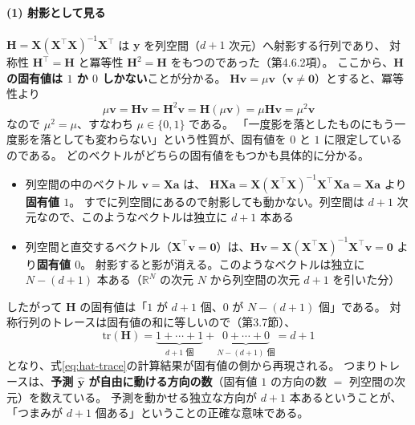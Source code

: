 \paragraph{(1) 射影として見る}
$\bm{H} = \bm{X}(\bm{X}^\top\bm{X})^{-1}\bm{X}^\top$ は $\bm{y}$ を列空間（$d+1$ 次元）へ射影する行列であり、
対称性 $\bm{H}^\top = \bm{H}$ と冪等性 $\bm{H}^2 = \bm{H}$ をもつのであった（第4.6.2項）。
ここから、\textbf{$\bm{H}$ の固有値は $1$ か $0$ しかない}ことが分かる。
$\bm{H}\bm{v} = \mu\bm{v}$（$\bm{v} \neq \bm{0}$）とすると、冪等性より
\begin{equation*}
  \mu\bm{v} = \bm{H}\bm{v} = \bm{H}^2\bm{v} = \bm{H}(\mu\bm{v}) = \mu\bm{H}\bm{v} = \mu^2\bm{v}
\end{equation*}
なので $\mu^2 = \mu$、すなわち $\mu \in \{0, 1\}$ である。
「一度影を落としたものにもう一度影を落としても変わらない」という性質が、固有値を $0$ と $1$ に限定しているのである。
どのベクトルがどちらの固有値をもつかも具体的に分かる。
\begin{itemize}
  \item 列空間の中のベクトル $\bm{v} = \bm{X}\bm{a}$ は、
    $\bm{H}\bm{X}\bm{a} = \bm{X}(\bm{X}^\top\bm{X})^{-1}\bm{X}^\top\bm{X}\bm{a} = \bm{X}\bm{a}$ より\textbf{固有値 $1$}。
    すでに列空間にあるので射影しても動かない。列空間は $d+1$ 次元なので、このようなベクトルは独立に $d+1$ 本ある
  \item 列空間と直交するベクトル（$\bm{X}^\top\bm{v} = \bm{0}$）は、$\bm{H}\bm{v} = \bm{X}(\bm{X}^\top\bm{X})^{-1}\bm{X}^\top\bm{v} = \bm{0}$ より\textbf{固有値 $0$}。
    射影すると影が消える。このようなベクトルは独立に $N - (d+1)$ 本ある（$\mathbb{R}^N$ の次元 $N$ から列空間の次元 $d+1$ を引いた分）
\end{itemize}
したがって $\bm{H}$ の固有値は「$1$ が $d+1$ 個、$0$ が $N - (d+1)$ 個」である。
対称行列のトレースは固有値の和に等しいので（第3.7節）、
\begin{equation*}
  \mathrm{tr}(\bm{H}) = \underbrace{1 + \cdots + 1}_{d+1 \text{ 個}} + \underbrace{0 + \cdots + 0}_{N-(d+1) \text{ 個}} = d+1
\end{equation*}
となり、式\eqref{eq:hat-trace}の計算結果が固有値の側から再現される。
つまりトレースは、\textbf{予測 $\hat{\bm{y}}$ が自由に動ける方向の数}（固有値 $1$ の方向の数 $=$ 列空間の次元）を数えている。
予測を動かせる独立な方向が $d+1$ 本あるということが、「つまみが $d+1$ 個ある」ということの正確な意味である。

